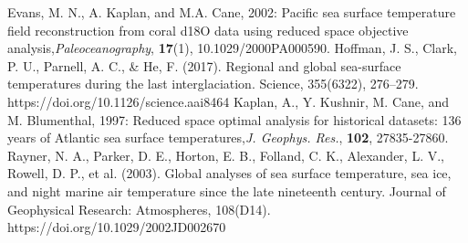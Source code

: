 \documentclass{article}
\begin{document}
\begin{thebibliography}{3}
    Evans, M. N., A. Kaplan, and M.A. Cane, 2002: Pacific sea surface temperature field reconstruction from coral d18O data using reduced space objective analysis,\textit{Paleoceanography}, \textbf{17}(1), 10.1029/2000PA000590.
     Hoffman, J. S., Clark, P. U., Parnell, A. C., \& He, F. (2017). Regional and global sea-surface temperatures during the last interglaciation. Science, 355(6322), 276–279. https://doi.org/10.1126/science.aai8464
    Kaplan, A., Y. Kushnir, M. Cane, and M. Blumenthal, 1997: Reduced space optimal analysis for historical datasets: 136 years of Atlantic sea surface temperatures,\textit{J. Geophys. Res.}, \textbf{102}, 27835-27860.
     Rayner, N. A., Parker, D. E., Horton, E. B., Folland, C. K., Alexander, L. V., Rowell, D. P., et al. (2003). Global analyses of sea surface temperature, sea ice, and night marine air temperature since the late nineteenth century. Journal of Geophysical Research: Atmospheres, 108(D14). https://doi.org/10.1029/2002JD002670
\end{thebibliography}
\end{document}

